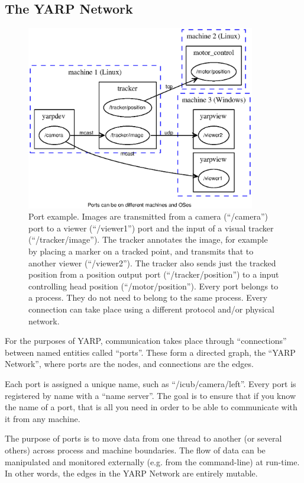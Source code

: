 \subsection{The YARP Network}


\begin{figure}[t]
\centerline{
\includegraphics[width=10cm]{fig-ports}
}
\caption{
%
Port example.
Images are transmitted from a camera (``/camera'') port to a viewer
(``/viewer1'') port and the input of a visual tracker
(``/tracker/image''). The tracker annotates the image, for example by
placing a marker on a tracked point, and transmits that to another
viewer (``/viewer2''). The tracker also sends just the tracked position
from a position output port (``/tracker/position'') to a input
controlling head position (``/motor/position''). Every port belongs to a
process. They do not need to belong to the same process. Every
connection can take place using a different protocol and/or physical
network.
%
}
\end{figure}

For the purposes of YARP, communication takes place through
``connections'' between named entities called ``ports''. These form a
directed graph, the ``YARP Network'', where ports are the nodes, and
connections are the edges.

Each port is assigned a unique name, such as
``/icub/camera/left''. Every port is registered by name with a ``name
server''. The goal is to ensure that if you know the name of a port,
that is all you need in order to be able to communicate with it from
any machine.

The purpose of ports is to move data from one thread to another (or
several others) across process and machine boundaries. The flow of
data can be manipulated and monitored externally (e.g. from the
command-line) at run-time. In other words, the edges in the YARP
Network are entirely mutable.

